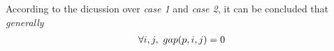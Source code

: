 \documentclass[11pt,a4paper]{article}
\begin{document}
According to the dicussion over {\it case 1} and {\it case 2}, it can be
concluded that {\it generally}
\begin{align}
    \forall i,j,\ gap(p,i,j) = 0
\end{align}

\end{document}
